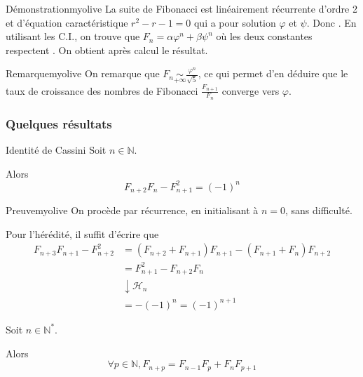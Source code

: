    \begin{demo}{Démonstration}{myolive}
        La suite de Fibonacci est linéairement récurrente d’ordre 2 et d’équation caractéristique $r^2 - r - 1 = 0$ qui a pour solution $\varphi$ et $\psi$. Donc . En utilisant les C.I., on trouve que $F_n = \alpha \varphi^n + \beta \psi^n$ où les deux constantes respectent . On obtient après calcul le résultat.
    \end{demo}

    \begin{omed}{Remarque}{myolive}
        On remarque que $F_n \underset{+\infty}{\sim} \frac{\varphi^n}{\sqrt{5}}$, ce qui permet d’en déduire que le taux de croissance des nombres de Fibonacci $\frac{F_{n+1}}{F_n}$ converge vers $\varphi$.
    \end{omed}

    \subsubsection{Quelques résultats}

    \begin{prop}{Identité de Cassini}{}
        Soit $n \in \mathbb{N}$.
        
        Alors \[ F_{n+2}F_{n} - F_{n+1}^2 = (-1)^n \]
    \end{prop}

    \begin{demo}{Preuve}{myolive}
        On procède par récurrence, en initialisant à $n = 0$, sans difficulté.
        
        Pour l’hérédité, il suffit d’écrire que 
        \begin{align*}
            F_{n+3}F_{n+1} - F_{n+2}^2 &= (F_{n+2} + F_{n+1})F_{n+1} - (F_{n+1} + F_n) F_{n+2} \\
            &= F_{n+1}^2 - F_{n+2}F_n \\
            & \downarrow \mathcal{H}_n \\
            &= -(-1)^n = (-1)^{n+1}
        \end{align*}
    \end{demo}

    \begin{prop}{}{}
        Soit $n \in \mathbb{N}^*$.
        
        Alors \[ \forall p \in \mathbb{N}, F_{n+p} = F_{n-1} F_p + F_n F_{p+1} \] 
    \end{prop}

